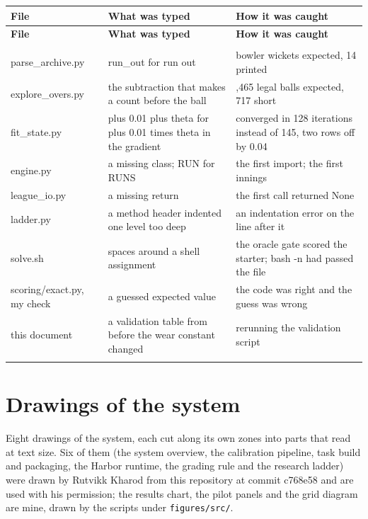 \documentclass[11pt,letterpaper]{article}
\begin{document}
\begin{small}
\begin{longtable}{>{\raggedright\arraybackslash}p{}>{\raggedright\arraybackslash}p{}>{\raggedright\arraybackslash}p{}}
\toprule
\textbf{File} & \textbf{What was typed} & \textbf{How it was caught} \\ \midrule
\endfirsthead
\toprule
\textbf{File} & \textbf{What was typed} & \textbf{How it was caught} \\ \midrule
\endhead
\midrule \multicolumn{3}{r}{\footnotesize continued on the next page} \\ \endfoot
\bottomrule \endlastfoot
parse\_archive.py & run\_out for run out & 12 bowler wickets expected, 14 printed \\ \addlinespace[2pt]
explore\_overs.py & the subtraction that makes a count before the ball & 125,465 legal balls expected, 717 short \\ \addlinespace[2pt]
fit\_state.py & plus 0.01 plus theta for plus 0.01 times theta in the gradient & converged in 128 iterations instead of 145, two rows off by 0.04 \\ \addlinespace[2pt]
engine.py & a missing class; RUN for RUNS & the first import; the first innings \\ \addlinespace[2pt]
league\_io.py & a missing return & the first call returned None \\ \addlinespace[2pt]
ladder.py & a method header indented one level too deep & an indentation error on the line after it \\ \addlinespace[2pt]
solve.sh & spaces around a shell assignment & the oracle gate scored the starter; bash -n had passed the file \\ \addlinespace[2pt]
scoring/exact.py, my check & a guessed expected value & the code was right and the guess was wrong \\ \addlinespace[2pt]
this document & a validation table from before the wear constant changed & rerunning the validation script \\ \addlinespace[2pt]
\end{longtable}
\end{small}

\section{Drawings of the system}

Eight drawings of the system, each cut along its own zones into parts that read at text size. Six of them (the system overview, the calibration pipeline, task build and packaging, the Harbor runtime, the grading rule and the research ladder) were drawn by Rutvikk Kharod from this repository at commit c768e58 and are used with his permission; the results chart, the pilot panels and the grid diagram are mine, drawn by the scripts under \texttt{figures/src/}.
\end{document}

